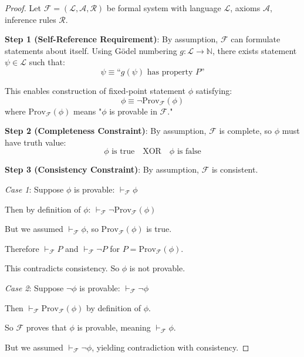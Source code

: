 \documentclass[11pt,onecolumn]{article}
\begin{document}
\begin{proof}
Let $\mathcal{F} = (\mathcal{L}, \mathcal{A}, \mathcal{R})$ be formal system with language $\mathcal{L}$, axioms $\mathcal{A}$, inference rules $\mathcal{R}$.

\textbf{Step 1 (Self-Reference Requirement)}: By assumption, $\mathcal{F}$ can formulate statements about itself. Using G\"odel numbering $g: \mathcal{L} \to \mathbb{N}$, there exists statement $\psi \in \mathcal{L}$ such that:
\begin{equation}
\psi \equiv \text{``}g(\psi) \text{ has property } P\text{''}
\end{equation}

This enables construction of fixed-point statement $\phi$ satisfying:
\begin{equation}
\phi \equiv \neg \text{Prov}_{\mathcal{F}}(\phi)
\end{equation}
where $\text{Prov}_{\mathcal{F}}(\phi)$ means "$\phi$ is provable in $\mathcal{F}$."

\textbf{Step 2 (Completeness Constraint)}: By assumption, $\mathcal{F}$ is complete, so $\phi$ must have truth value:
\begin{equation}
\phi \text{ is true} \quad \text{XOR} \quad \phi \text{ is false}
\end{equation}

\textbf{Step 3 (Consistency Constraint)}: By assumption, $\mathcal{F}$ is consistent.

\textit{Case 1}: Suppose $\phi$ is provable: $\vdash_{\mathcal{F}} \phi$

Then by definition of $\phi$: $\vdash_{\mathcal{F}} \neg \text{Prov}_{\mathcal{F}}(\phi)$

But we assumed $\vdash_{\mathcal{F}} \phi$, so $\text{Prov}_{\mathcal{F}}(\phi)$ is true.

Therefore $\vdash_{\mathcal{F}} P$ and $\vdash_{\mathcal{F}} \neg P$ for $P = \text{Prov}_{\mathcal{F}}(\phi)$.

This contradicts consistency. So $\phi$ is not provable.

\textit{Case 2}: Suppose $\neg \phi$ is provable: $\vdash_{\mathcal{F}} \neg \phi$

Then $\vdash_{\mathcal{F}} \text{Prov}_{\mathcal{F}}(\phi)$ by definition of $\phi$.

So $\mathcal{F}$ proves that $\phi$ is provable, meaning $\vdash_{\mathcal{F}} \phi$.

But we assumed $\vdash_{\mathcal{F}} \neg \phi$, yielding contradiction with consistency.


\end{proof}
\end{document}
